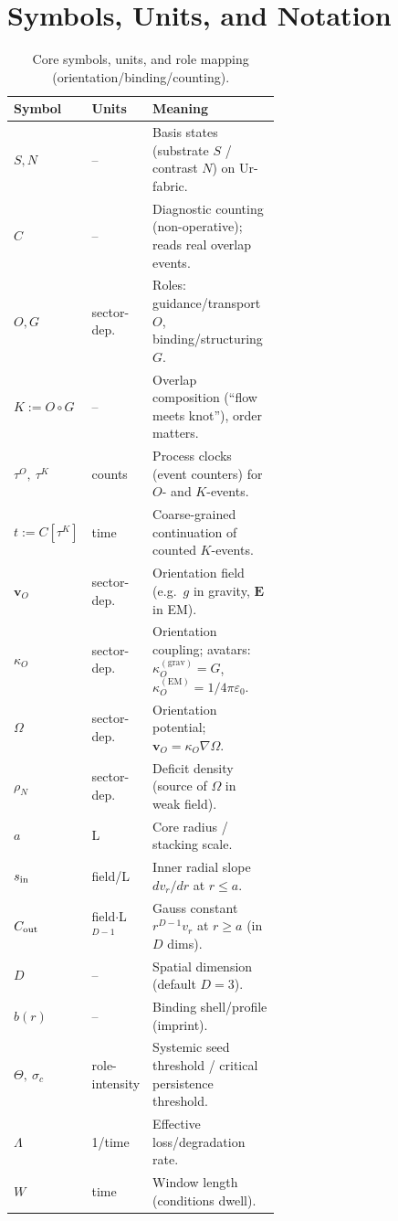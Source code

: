 \documentclass[12pt,a4paper,oneside]{scrreprt}
\begin{document}
\chapter{Symbols, Units, and Notation}\label{app:symbols}
\begin{table}[htbp]\centering
\caption{Core symbols, units, and role mapping (orientation/binding/counting).}
\begin{tabular}{llp{0.58\linewidth}}\toprule
Symbol & Units & Meaning \\ \midrule
$S,N$ & – & Basis states (substrate $S$ / contrast $N$) on Ur-fabric.\\
$C$ & – & Diagnostic counting (non-operative); reads real overlap events.\\
$O,G$ & sector-dep. & Roles: guidance/transport $O$, binding/structuring $G$.\\
$K:=O\!\circ G$ & – & Overlap composition (“flow meets knot”), order matters.\\
$\tau^O,\ \tau^K$ & counts & Process clocks (event counters) for $O$- and $K$-events.\\
$t:=C[\tau^K]$ & time & Coarse-grained continuation of counted $K$-events.\\
$\mathbf v_O$ & sector-dep. & Orientation field (e.g.\ $g$ in gravity, $\mathbf E$ in EM).\\
$\kappa_O$ & sector-dep. & Orientation coupling; avatars: $\kappa_O^{(\mathrm{grav})}=G$, $\kappa_O^{(\mathrm{EM})}=1/4\pi\varepsilon_0$.\\
$\Omega$ & sector-dep. & Orientation potential; $\mathbf v_O=\kappa_O\nabla\Omega$.\\
$\rho_N$ & sector-dep. & Deficit density (source of $\Omega$ in weak field).\\
$a$ & L & Core radius / stacking scale.\\
$s_{\rm in}$ & field/L & Inner radial slope $dv_r/dr$ at $r\le a$.\\
$C_{\rm out}$ & field$\cdot$L$^{D-1}$ & Gauss constant $r^{D-1}v_r$ at $r\ge a$ (in $D$ dims).\\
$D$ & – & Spatial dimension (default $D=3$).\\
$b(r)$ & – & Binding shell/profile (imprint).\\
$\Theta,\ \sigma_c$ & role-intensity & Systemic seed threshold / critical persistence threshold.\\
$\Lambda$ & 1/time & Effective loss/degradation rate.\\
$W$ & time & Window length (conditions dwell).\\

\end{tabular}
\end{table}
\end{document}
